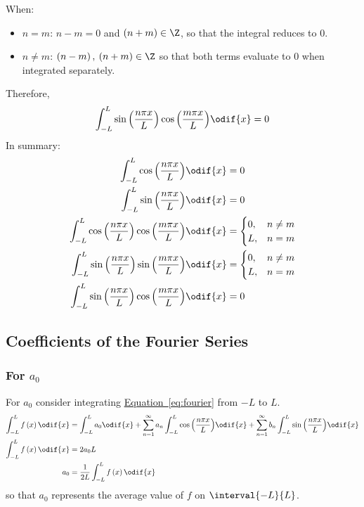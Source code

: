\documentclass{article}
\begin{document}
When:
\begin{itemize}
    \item \(n = m\): \(n - m = 0\) and \(\left( n + m \right) \in \Z\), so that the integral reduces to \(0\).
    \item \(n \neq m\): \(\left( n - m \right),\: \left( n + m \right) \in \Z\) so that both terms evaluate to \(0\) when integrated separately.
\end{itemize}
Therefore,
\begin{equation*}
    \int_{-L}^L \sin{\left( \frac{n \pi x}{L} \right)} \cos{\left( \frac{m \pi x}{L} \right)} \odif{x} = 0
\end{equation*}
In summary:
\begin{align}
    \int_{-L}^L \cos{\left( \frac{n \pi x}{L} \right)} \odif{x}                                        & = 0 \label{eq:cosine} \\
    \int_{-L}^L \sin{\left( \frac{n \pi x}{L} \right)} \odif{x}                                        & = 0 \label{eq:sine}   \\
    \int_{-L}^L \cos{\left( \frac{n \pi x}{L} \right)} \cos{\left( \frac{m \pi x}{L} \right)} \odif{x} & =
    \begin{cases}
        0, & n \neq m \\
        L, & n = m
    \end{cases}
    \\
    \int_{-L}^L \sin{\left( \frac{n \pi x}{L} \right)} \sin{\left( \frac{m \pi x}{L} \right)} \odif{x} & =
    \begin{cases}
        0, & n \neq m \\
        L, & n = m
    \end{cases}
    \\
    \int_{-L}^L \sin{\left( \frac{n \pi x}{L} \right)} \cos{\left( \frac{m \pi x}{L} \right)} \odif{x} & = 0
\end{align}
\subsection{Coefficients of the Fourier Series}
\subsubsection{For \texorpdfstring{\(a_0\)}{a0}}
For \(a_0\) consider integrating \hyperref[eq:fourier]{Equation~\ref{eq:fourier}} from \(-L\) to \(L\).
\begin{align*}
    \int_{-L}^L f\left( x \right) \odif{x} & = \int_{-L}^L a_0 \odif{x} + \sum_{n = 1}^\infty a_n \int_{-L}^L \cos{\left( \frac{n \pi x}{L} \right)} \odif{x} + \sum_{n = 1}^\infty b_n \int_{-L}^L \sin{\left( \frac{n \pi x}{L} \right)} \odif{x} \\
    \int_{-L}^L f\left( x \right) \odif{x} & = 2 a_0 L                                                                                                                                                                                              \\
    a_0                                    & = \frac{1}{2L} \int_{-L}^L f\left( x \right) \odif{x}
\end{align*}
so that \(a_0\) represents the average value of \(f\) on \(\interval{-L}{L}\).
\end{document}
